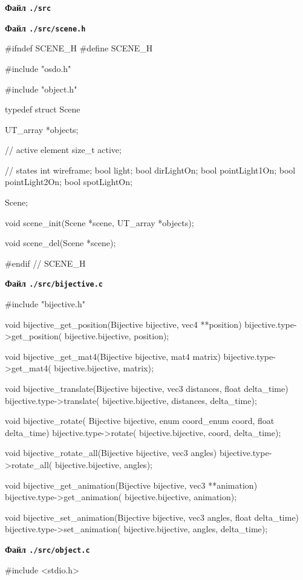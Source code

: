 \begin{multicols}{2}
\noindent\cprotect\textbf{Файл \verb+./src+}
\begin{ccode}
\end{ccode}
\noindent\cprotect\textbf{Файл \verb+./src/scene.h+}
\begin{ccode}
#ifndef SCENE_H
#define SCENE_H

#include "osdo.h"

#include "object.h"

typedef struct Scene {
    UT_array *objects;

    // active element
    size_t active;

    // states
    int wireframe;
    bool light;
    bool dirLightOn;
    bool pointLight1On;
    bool pointLight2On;
    bool spotLightOn;
} Scene;

void scene_init(Scene *scene, UT_array *objects);

void scene_del(Scene *scene);

#endif // SCENE_H
\end{ccode}
\noindent\cprotect\textbf{Файл \verb+./src/bijective.c+}
\begin{ccode}
#include "bijective.h"

void bijective_get_position(Bijective bijective, vec4 **position) {
    bijective.type->get_position(
                bijective.bijective, position);
}

void bijective_get_mat4(Bijective bijective, mat4 matrix) {
    bijective.type->get_mat4(
                bijective.bijective, matrix);
}

void bijective_translate(Bijective bijective, vec3 distances, float delta_time) {
    bijective.type->translate(
                bijective.bijective, distances, delta_time);
}

void bijective_rotate(
        Bijective bijective, enum coord_enum coord, float delta_time) {
    bijective.type->rotate(
                bijective.bijective, coord, delta_time);
}

void bijective_rotate_all(Bijective bijective, vec3 angles) {
    bijective.type->rotate_all(
                bijective.bijective, angles);
}

void bijective_get_animation(Bijective bijective, vec3 **animation) {
    bijective.type->get_animation(
                bijective.bijective, animation);
}

void bijective_set_animation(Bijective bijective, vec3 angles, float delta_time) {
    bijective.type->set_animation(
                bijective.bijective, angles, delta_time);
}
\end{ccode}
\noindent\cprotect\textbf{Файл \verb+./src/object.c+}
\begin{ccode}
#include <stdio.h>


\end{ccode}
\end{multicols}
